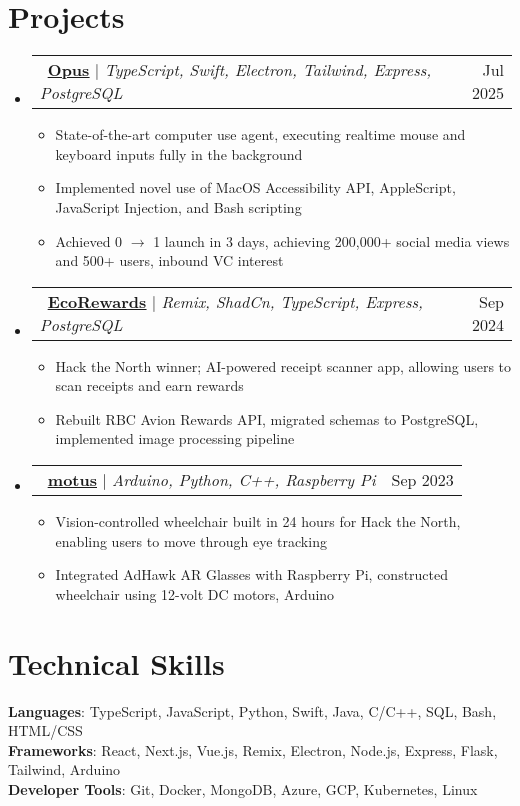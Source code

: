 \documentclass[letterpaper,11pt]{article}
\makeatletter
\newcommand{\resumeItem}[1]{
  \item\small{
    {#1 \vspace{-2pt}}
  }
}
\newcommand{\resumeProjectHeading}[2]{
    \item
    \begin{tabular*}{0.97\textwidth}{l@{\extracolsep{\fill}}r}
      \small#1 & #2 \\
    \end{tabular*}\vspace{-7pt}
}
\newcommand{\resumeSubHeadingListStart}{\begin{itemize}[leftmargin=0.15in, label={}]}
\newcommand{\resumeSubHeadingListEnd}{\end{itemize}}
\newcommand{\resumeItemListStart}{\begin{itemize}}
\newcommand{\resumeItemListEnd}{\end{itemize}\vspace{-5pt}}
\makeatother
\begin{document}
\section{Projects}
    \resumeSubHeadingListStart
      \resumeProjectHeading
          {\faGithub\ \href{https://github.com/jeffrey-zang/opus}{\textbf{\underline{Opus}}} $|$ \emph{TypeScript, Swift, Electron, Tailwind, Express, PostgreSQL}}{Jul 2025}
          \resumeItemListStart
            \resumeItem{State-of-the-art computer use agent, executing realtime mouse and keyboard inputs fully in the background}
            \resumeItem{Implemented novel use of MacOS Accessibility API, AppleScript, JavaScript Injection, and Bash scripting}
            \resumeItem{Achieved 0 \(\rightarrow\) 1 launch in 3 days, achieving 200,000+ social media views and 500+ users, inbound VC interest}
          \resumeItemListEnd
      \resumeProjectHeading
          {\faGithub\ \href{https://github.com/jeffrey-zang/ecorewards}{\textbf{\underline{EcoRewards}}} $|$ \emph{Remix, ShadCn, TypeScript, Express, PostgreSQL}}{Sep 2024}
          \resumeItemListStart
            \resumeItem{Hack the North winner; AI-powered receipt scanner app, allowing users to scan receipts and earn rewards}
            \resumeItem{Rebuilt RBC Avion Rewards API, migrated schemas to PostgreSQL, implemented image processing pipeline}
          \resumeItemListEnd
      \resumeProjectHeading
        {\faGithub\ \href{https://github.com/jeffrey-zang/motus}{\textbf{\underline{motus}}} $|$ \emph{Arduino, Python, C++, Raspberry Pi}}{Sep 2023}
          \resumeItemListStart
            \resumeItem{Vision-controlled wheelchair built in 24 hours for Hack the North, enabling users to move through eye tracking}
            \resumeItem{Integrated AdHawk AR Glasses with Raspberry Pi, constructed wheelchair using 12-volt DC motors, Arduino}
          \resumeItemListEnd
    \resumeSubHeadingListEnd

%
\section{Technical Skills}
 \begin{itemize}[leftmargin=0.15in, label={}]
    \small{\item{
     \textbf{Languages}{: TypeScript, JavaScript, Python, Swift, Java, C/C++, SQL, Bash, HTML/CSS} \\
     \textbf{Frameworks}{: React, Next.js, Vue.js, Remix, Electron, Node.js, Express, Flask, Tailwind, Arduino} \\
     \textbf{Developer Tools}{: Git, Docker, MongoDB, Azure, GCP, Kubernetes, Linux} \\
    }}
 \end{itemize}


\end{document}
